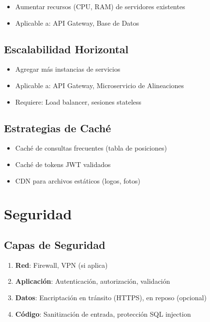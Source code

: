 \documentclass[
  spanish,
  11pt,
  letterpaper,
]{book}
\providecommand{\tightlist}{%
  \setlength{\itemsep}{0pt}\setlength{\parskip}{0pt}}
\begin{document}
\begin{itemize}
\tightlist
\item
  Aumentar recursos (CPU, RAM) de servidores existentes
\item
  Aplicable a: API Gateway, Base de Datos
\end{itemize}

\subsection{Escalabilidad Horizontal}\label{escalabilidad-horizontal-1}

\begin{itemize}
\tightlist
\item
  Agregar más instancias de servicios
\item
  Aplicable a: API Gateway, Microservicio de Alineaciones
\item
  Requiere: Load balancer, sesiones stateless
\end{itemize}

\subsection{Estrategias de Caché}\label{estrategias-de-cachuxe9}

\begin{itemize}
\tightlist
\item
  Caché de consultas frecuentes (tabla de posiciones)
\item
  Caché de tokens JWT validados
\item
  CDN para archivos estáticos (logos, fotos)
\end{itemize}

\section{Seguridad}\label{seguridad}

\subsection{Capas de Seguridad}\label{capas-de-seguridad}

\begin{enumerate}
\def\labelenumi{\arabic{enumi}.}
\tightlist
\item
  \textbf{Red}: Firewall, VPN (si aplica)
\item
  \textbf{Aplicación}: Autenticación, autorización, validación
\item
  \textbf{Datos}: Encriptación en tránsito (HTTPS), en reposo (opcional)
\item
  \textbf{Código}: Sanitización de entrada, protección SQL injection
\end{enumerate}
\end{document}
